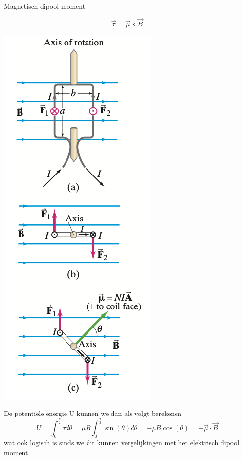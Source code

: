 \begin{theo}{Magnetisch dipool moment}
\begin{minipage}{0.81\textwidth}
        \begin{equation*}
            \Vec{\tau} = \Vec{\mu} \times \Vec{B}
        \end{equation*}
    \end{minipage}
    \hspace{0.05cm}\begin{minipage}{.13\textwidth}
        \includegraphics[scale = 0.3]{Images/Magnetisme/MagnetischDipoolMoment}
    \end{minipage}
    

    \noindent De potentiële energie U kunnen we dan als volgt berekenen
    \begin{equation*}
        U = \int_0^{\tfrac{\pi}{2}} \tau d\theta = \mu B \int_0^{\tfrac{\pi}{2}} \sin(\theta) d\theta = -\mu B\cos(\theta) = -\Vec{\mu} \cdot \Vec{B}
    \end{equation*}
    wat ook logisch is sinds we dit kunnen vergelijkingen met het elektrisch dipool moment.
\end{theo}

